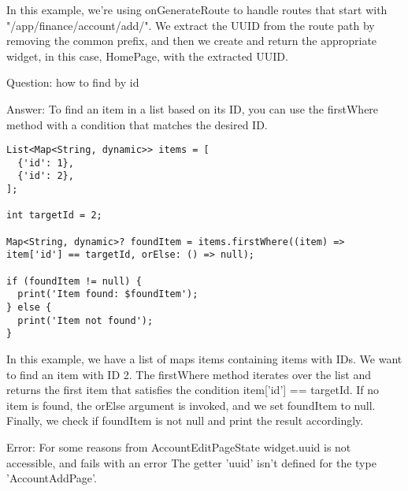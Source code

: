 In this example, we're using onGenerateRoute to handle routes that start with "/app/finance/account/add/". 
We extract the UUID from the route path by removing the common prefix, and then we create and return the 
appropriate widget, in this case, HomePage, with the extracted UUID.

Question: \q{[{id: 1}, {id: 2}]} how to find by id

Answer: To find an item in a list based on its ID, you can use the firstWhere method with a condition that 
matches the desired ID. 

\begin{lstlisting}
List<Map<String, dynamic>> items = [
  {'id': 1},
  {'id': 2},
];

int targetId = 2;

Map<String, dynamic>? foundItem = items.firstWhere((item) => item['id'] == targetId, orElse: () => null);

if (foundItem != null) {
  print('Item found: $foundItem');
} else {
  print('Item not found');
}
\end{lstlisting}

In this example, we have a list of maps items containing items with IDs. We want to find an item with ID 2. 
The firstWhere method iterates over the list and returns the first item that satisfies the condition 
item['id'] == targetId. If no item is found, the orElse argument is invoked, and we set foundItem to null. 
Finally, we check if foundItem is not null and print the result accordingly.

Error: For some reasons from AccountEditPageState widget.uuid is not accessible, and fails with an error The getter 
'uuid' isn't defined for the type 'AccountAddPage'.

